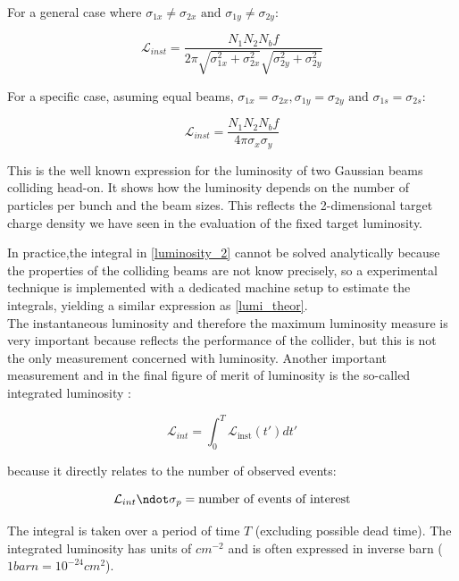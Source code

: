 For a general case where $\sigma_{1x}\neq \sigma_{2x} \text{ and } \sigma_{1y}\neq \sigma_{2y}$:

\begin{equation}
  \mathcal{L}_{inst}= \frac{N_{1} N_{2} N_{b}f }{2\pi \sqrt{\sigma_{1x}^{2}+\sigma_{2x}^{2}}\sqrt{\sigma_{2y}^{2}+\sigma_{2y}^{2}}}
  \label{lumi_general}
\end{equation}

For a specific case, asuming equal beams, $\sigma_{1x}= \sigma_{2x} ,\sigma_{1y}= \sigma_{2y} \text{ and } \sigma_{1s}= \sigma_{2s}$:

\begin{equation}
  \mathcal{L}_{inst}= \frac{N_{1} N_{2} N_{b}f }{4\pi \sigma_{x} \sigma_{y}}
  \label{lumi_theor}
\end{equation}

This is the well known expression for the luminosity of two Gaussian beams colliding head-on. It shows how the luminosity depends on the number of particles per bunch and the beam sizes. This reflects the 2-dimensional target charge density we have seen in the evaluation of the fixed target luminosity.

In practice,the integral in  \ref{luminosity_2} cannot be solved analytically because   the properties of the colliding beams are not know precisely, so a experimental technique is implemented with a dedicated machine setup to estimate the integrals, yielding a similar expression as \ref{lumi_theor}.\\

The instantaneous luminosity and therefore the maximum luminosity measure is very important  because reflects the performance of the collider, but  this is not the only measurement concerned with luminosity. Another important measurement and in the final figure of merit of luminosity is the so-called integrated luminosity \cite{ref_lib_vol3}:

\begin{equation}
  \mathcal{L}_{int}=\int_{0}^{T} \mathcal {L}_{\text{inst}}(t') dt'
\end{equation}

because it directly relates to the number of observed events:

\begin{equation}
  \mathcal{L}_{int} \ndot \sigma_{p}= \text{number of events of interest}
\end{equation}

The integral is taken over a period of time $T$ (excluding possible dead time). The integrated luminosity has units of $cm^{-2}$ and is often expressed in inverse barn ($1 barn= 10^{-24}cm^{2}$). \\


